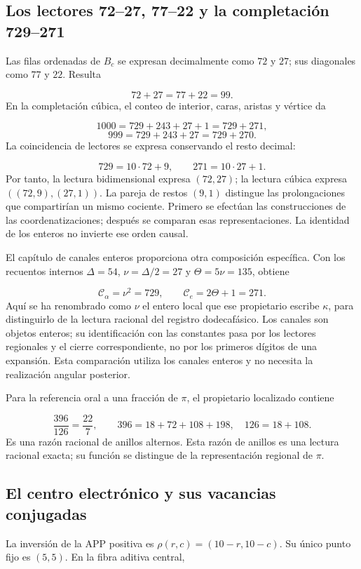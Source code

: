 \subsection{Los lectores 72–27, 77–22 y la completación 729–271}
Las filas ordenadas de \(B_c\) se expresan decimalmente como \(72\) y \(27\); sus diagonales como \(77\) y \(22\). Resulta

\[
72+27=77+22=99.
\]
En la completación cúbica, el conteo de interior, caras, aristas y vértice da

\[
1000=729+243+27+1=729+271,
\]
\[
999=729+243+27=729+270.
\]
La coincidencia de lectores se expresa conservando el resto decimal:

\[
729=10\cdot72+9,\qquad271=10\cdot27+1.
\]
Por tanto, la lectura bidimensional expresa \((72,27)\); la lectura cúbica expresa \(((72,9),(27,1))\). La pareja de restos \((9,1)\) distingue las prolongaciones que compartirían un mismo cociente. Primero se efectúan las construcciones de las coordenatizaciones; después se comparan esas representaciones. La identidad de los enteros no invierte ese orden causal.

El capítulo de canales enteros proporciona otra composición específica. Con los recuentos internos \(\Delta=54\), \(\nu=\Delta/2=27\) y \(\Theta=5\nu=135\), obtiene

\[
\mathcal C_\alpha=\nu^2=729,
\qquad \mathcal C_e=2\Theta+1=271.
\]
Aquí se ha renombrado como \(\nu\) el entero local que ese propietario escribe \(\kappa\), para distinguirlo de la lectura racional del registro dodecafásico. Los canales son objetos enteros; su identificación con las constantes pasa por los lectores regionales y el cierre correspondiente, no por los primeros dígitos de una expansión. Esta comparación utiliza los canales enteros y no necesita la realización angular posterior.

Para la referencia oral a una fracción de \(\pi\), el propietario localizado contiene

\[
\frac{396}{126}=\frac{22}{7},\qquad
396=18+72+108+198,\quad126=18+108.
\]
Es una razón racional de anillos alternos. Esta razón de anillos es una lectura racional exacta; su función se distingue de la representación regional de \(\pi\).

\subsection{El centro electrónico y sus vacancias conjugadas}
La inversión de la APP positiva es \(\rho(r,c)=(10-r,10-c)\). Su único punto fijo es \((5,5)\). En la fibra aditiva central,


